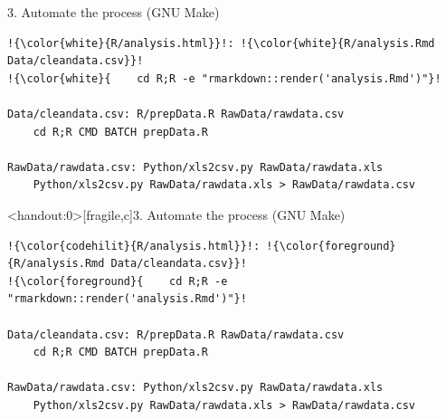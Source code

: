 \documentclass[12pt,t]{beamer}
\begin{document}
\begin{frame}[fragile,c]{3. Automate the process (GNU Make)}

\begin{center}
\begin{minipage}[c]{10.8cm}
\begin{semiverbatim}
\begin{lstlisting}[escapechar=!,linewidth=10.8cm]
!{\color{white}{R/analysis.html}}!: !{\color{white}{R/analysis.Rmd Data/cleandata.csv}}!
!{\color{white}{    cd R;R -e "rmarkdown::render('analysis.Rmd')"}!

Data/cleandata.csv: R/prepData.R RawData/rawdata.csv
    cd R;R CMD BATCH prepData.R

RawData/rawdata.csv: Python/xls2csv.py RawData/rawdata.xls
    Python/xls2csv.py RawData/rawdata.xls > RawData/rawdata.csv
\end{lstlisting}
\end{semiverbatim}
\end{minipage}
\end{center}

\end{frame}



\begin{frame}<handout:0>[fragile,c]{3. Automate the process (GNU Make)}

\addtocounter{framenumber}{-1}

\begin{center}
\begin{minipage}[c]{10.8cm}
\begin{semiverbatim}
\begin{lstlisting}[escapechar=!,linewidth=10.8cm]
!{\color{codehilit}{R/analysis.html}}!: !{\color{foreground}{R/analysis.Rmd Data/cleandata.csv}}!
!{\color{foreground}{    cd R;R -e "rmarkdown::render('analysis.Rmd')"}!

Data/cleandata.csv: R/prepData.R RawData/rawdata.csv
    cd R;R CMD BATCH prepData.R

RawData/rawdata.csv: Python/xls2csv.py RawData/rawdata.xls
    Python/xls2csv.py RawData/rawdata.xls > RawData/rawdata.csv
\end{lstlisting}
\end{semiverbatim}
\end{minipage}
\end{center}

\end{frame}
\end{document}
